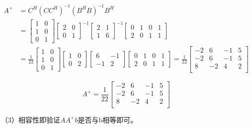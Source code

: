 \documentclass[11pt, a4paper]{article}
\begin{document}
$$\begin{aligned}A^+ &= C^H(CC^H)^{-1}(B^HB)^{-1}B^H\\
&= \begin{bmatrix}1&0\\1&0\\0&1\end{bmatrix}
\begin{bmatrix}2 & 0\\0 & 1\end{bmatrix}^{-1}
\begin{bmatrix}2 & 1\\1 & 6\end{bmatrix}^{-1}
\begin{bmatrix}0&1&0&1\\2&0&1&1\end{bmatrix}\\
&=\displaystyle\frac{1}{22}\begin{bmatrix}1&0\\1&0\\0&1\end{bmatrix}
\begin{bmatrix}1 & 0\\0 & 2\end{bmatrix}
\begin{bmatrix}6 & -1\\-1 & 2\end{bmatrix}
\begin{bmatrix}0&1&0&1\\2&0&1&1\end{bmatrix}
=\displaystyle\frac{1}{22}
\begin{bmatrix}
-2&6&-1&5\\
-2&6&-1&5\\
8&-2&4&2\\
\end{bmatrix}
\end{aligned}$$

$$A^+=\displaystyle\frac{1}{22}
\begin{bmatrix}
-2&6&-1&5\\
-2&6&-1&5\\
8&-2&4&2\\
\end{bmatrix}$$


（3）相容性即验证$AA^+b$是否与b相等即可。
\end{document}
